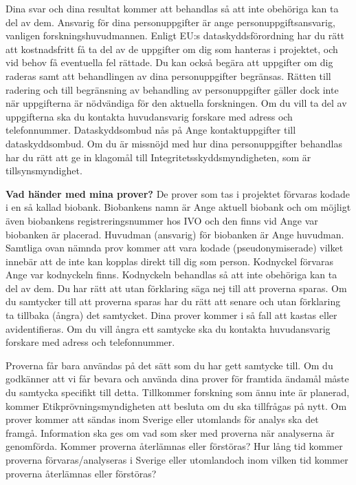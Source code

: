 \documentclass[
]{book}
\begin{document}
Dina svar och dina resultat kommer att behandlas så att inte obehöriga kan ta del av dem. Ansvarig för dina personuppgifter är ange personuppgiftsansvarig, vanligen forskningshuvudmannen. Enligt EU:s dataskyddsförordning har du rätt att kostnadsfritt få ta del av de uppgifter om dig som hanteras i projektet, och vid behov få eventuella fel rättade. Du kan också begära att uppgifter om dig raderas samt att behandlingen av dina personuppgifter begränsas. Rätten till radering och till begränsning av behandling av personuppgifter gäller dock inte när uppgifterna är nödvändiga för den aktuella forskningen. Om du vill ta del av uppgifterna ska du kontakta huvudansvarig forskare med adress och telefonnummer. Dataskyddsombud nås på Ange kontaktuppgifter till dataskyddsombud. Om du är missnöjd med hur dina personuppgifter behandlas har du rätt att ge in klagomål till Integritetsskyddsmyndigheten, som är tillsynsmyndighet.

\textbf{Vad händer med mina prover?} De prover som tas i projektet förvaras kodade i en så kallad biobank. Biobankens namn är Ange aktuell biobank och om möjligt även biobankens registreringsnummer hos IVO och den finns vid Ange var biobanken är placerad. Huvudman (ansvarig) för biobanken är Ange huvudman. Samtliga ovan nämnda prov kommer att vara kodade (pseudonymiserade) vilket innebär att de inte kan kopplas direkt till dig som person. Kodnyckel förvaras Ange var kodnyckeln finns. Kodnyckeln behandlas så att inte obehöriga kan ta del av dem. Du har rätt att utan förklaring säga nej till att proverna sparas. Om du samtycker till att proverna sparas har du rätt att senare och utan förklaring ta tillbaka (ångra) det samtycket. Dina prover kommer i så fall att kastas eller avidentifieras. Om du vill ångra ett samtycke ska du kontakta huvudansvarig forskare med adress och telefonnummer.

Proverna får bara användas på det sätt som du har gett samtycke till. Om du godkänner att vi får bevara och använda dina prover för framtida ändamål måste du samtycka specifikt till detta. Tillkommer forskning som ännu inte är planerad, kommer Etikprövningsmyndigheten att besluta om du ska tillfrågas på nytt. Om prover kommer att sändas inom Sverige eller utomlands för analys ska det framgå. Information ska ges om vad som sker med proverna när analyserna är genomförda. Kommer proverna återlämnas eller förstöras? Hur lång tid kommer proverna förvaras/analyseras i Sverige eller utomlandoch inom vilken tid kommer proverna återlämnas eller förstöras?
\end{document}
